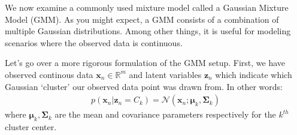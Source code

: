 \documentclass[12pt,letterpaper]{article}
\begin{document}

We now examine a commonly used 
mixture model called a Gaussian Mixture Model (GMM). As you might expect, a GMM consists of a combination of multiple Gaussian distributions. Among other things, it is useful for modeling scenarios where the observed data is continuous.

Let's go over a more rigorous formulation of the GMM setup. First, we have observed continous data $\textbf{x}_n \in \mathbb{R}^{m}$ and latent variables $\textbf{z}_n$ which indicate which Gaussian `cluster' our observed data point was drawn from. In other words:
\begin{align*}
    p(\textbf{x}_n | \textbf{z}_n = C_k) = \mathcal{N}(\textbf{x}_n; \boldsymbol{\mu}_k, \boldsymbol{\Sigma}_k)
\end{align*}
where $\boldsymbol{\mu}_k, \boldsymbol{\Sigma}_k$ are the mean and covariance parameters respectively for the $k^{th}$ cluster center.
\end{document}
